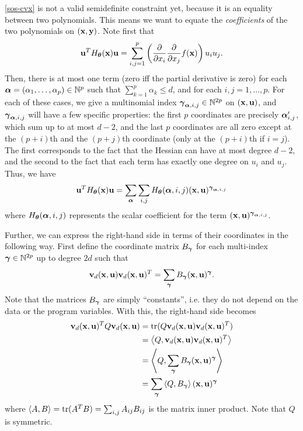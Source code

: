 \documentclass[11pt]{article}
\begin{document}
\eqref{sos-cvx} is not a valid semidefinite constraint yet, because it is an equality between two polynomials. This means we want to equate the \emph{coefficients} of the two polynomials on $({\bf x}, {\bf y})$. Note first that
\begin{equation}\label{hessian}
{\bf u}^TH_{\boldsymbol\theta}({\bf x}){\bf u} = \sum_{i,j=1}^p \left(\frac{\partial}{\partial x_i}\frac{\partial}{\partial x_j}f({\bf x})\right) u_iu_j.
\end{equation}
Then, there is at most one term (zero iff the partial derivative is zero) for each ${\boldsymbol\alpha} = (\alpha_1, \dotsc, \alpha_p) \in {\mathbb{N}}^p$ such that $\sum_{k=1}^p \alpha_k \leq d$, and for each $i, j = 1, \dotsc, p$. For each of these cases, we give a multinomial index ${\boldsymbol\gamma}_{{\boldsymbol\alpha}, i, j} \in {\mathbb{N}}^{2p}$ on $({\bf x}, {\bf u})$, and ${\boldsymbol\gamma}_{{\boldsymbol\alpha}, i, j}$ will have a few specific properties: the first $p$ coordinates are precisely ${\boldsymbol\alpha}_{i,j}'$, which sum up to at most $d-2$, and the last $p$ coordinates are all zero except at the $(p+i)$th and the $(p+j)$th coordinate (only at the $(p+i)$th if $i = j$). The first corresponds to the fact that the Hessian can have at most degree $d-2$, and the second to the fact that each term has exactly one degree on $u_i$ and $u_j$. Thus, we have
\begin{equation}\label{lhs}
{\bf u}^TH_{\boldsymbol\theta}({\bf x}){\bf u} = \sum_{\boldsymbol\alpha} \sum_{i,j} H_{\boldsymbol\theta}({\boldsymbol\alpha}, i, j) ({\bf x}, {\bf u})^{{\boldsymbol\gamma}_{{\boldsymbol\alpha}, i, j}}
\end{equation}
where $H_{\boldsymbol\theta}({\boldsymbol\alpha}, i, j)$ represents the scalar coefficient for the term $({\bf x}, {\bf u})^{{\boldsymbol\gamma}_{{\boldsymbol\alpha}, i, j}}$.

Further, we can express the right-hand side in terms of their coordinates in the following way. First define the coordinate matrix $B_{\boldsymbol\gamma}$ for each multi-index ${\boldsymbol\gamma} \in {\mathbb{N}}^{2p}$ up to degree $2d$ such that
\[
{\bf v}_d({\bf x}, {\bf u}){\bf v}_d({\bf x}, {\bf u})^T = \sum_{\boldsymbol\gamma} B_{\boldsymbol\gamma} ({\bf x}, {\bf u})^{\boldsymbol\gamma}.
\]
Note that the matrices $B_{\boldsymbol\gamma}$ are simply ``constants'', i.e. they do not depend on the data or the program variables. With this, the right-hand side becomes
\begin{align}\label{rhs}
{\bf v}_d({\bf x},{\bf u})^TQ{\bf v}_d({\bf x},{\bf u}) &= \operatorname{tr}(Q{\bf v}_d({\bf x}, {\bf u}){\bf v}_d({\bf x}, {\bf u})^T) \notag\\
&= \left\langle Q, {\bf v}_d({\bf x}, {\bf u}){\bf v}_d({\bf x}, {\bf u})^T \right\rangle \notag\\
&= \left\langle Q, \sum_{\boldsymbol\gamma} B_{\boldsymbol\gamma} ({\bf x}, {\bf u})^{\boldsymbol\gamma} \right\rangle \notag\\
&= \sum_{\boldsymbol\gamma} \left\langle Q, B_{\boldsymbol\gamma} \right\rangle({\bf x}, {\bf u})^{\boldsymbol\gamma}
\end{align}
where $\left\langle A,B \right\rangle = \operatorname{tr}(A^TB) = \sum_{i,j} A_{ij}B_{ij}$ is the matrix inner product. Note that $Q$ is symmetric.
\end{document}
